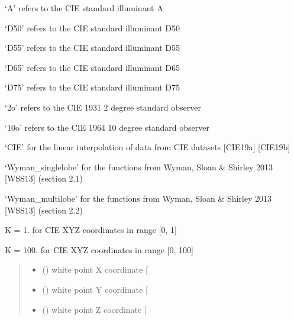 \documentclass[letterpaper,10pt,english]{sphinxmanual}
\begin{document}
\begin{fulllineitems}
\begin{DUlineblock}{0em}
\item[] ‘A’ refers to the CIE standard illuminant A
\item[] ‘D50’ refers to the CIE standard illuminant D50
\item[] ‘D55’ refers to the CIE standard illuminant D55
\item[] ‘D65’ refers to the CIE standard illuminant D65
\item[] ‘D75’ refers to the CIE standard illuminant D75
\end{DUlineblock}

\begin{DUlineblock}{0em}
\item[] ‘2o’ refers to the CIE 1931 2 degree standard observer
\item[] ‘10o’ refers to the CIE 1964 10 degree standard observer
\end{DUlineblock}

\begin{DUlineblock}{0em}
\item[] ‘CIE’ for the linear interpolation of data from CIE datasets {[}CIE19a{]} {[}CIE19b{]}
\item[] ‘Wyman\_singlelobe’ for the functions from Wyman, Sloan \& Shirley 2013 {[}WSS13{]} (section 2.1)
\item[] ‘Wyman\_multilobe’ for the functions from Wyman, Sloan \& Shirley 2013 {[}WSS13{]} (section 2.2)
\end{DUlineblock}

\begin{DUlineblock}{0em}
\item[] K = 1. for CIE XYZ coordinates in range {[}0, 1{]}
\item[] K = 100. for CIE XYZ coordinates in range {[}0, 100{]}
\end{DUlineblock}
\begin{quote}\begin{description}
\sphinxAtStartPar
\begin{itemize}
\item {} 
\sphinxAtStartPar
{} () \textendash{} white point X coordinate {[}\sphinxhyphen{}{]}

\item {} 
\sphinxAtStartPar
{} () \textendash{} white point Y coordinate {[}\sphinxhyphen{}{]}

\item {} 
\sphinxAtStartPar
{} () \textendash{} white point Z coordinate {[}\sphinxhyphen{}{]}

\end{itemize}


\end{description}\end{quote}

\end{fulllineitems}
\end{document}
